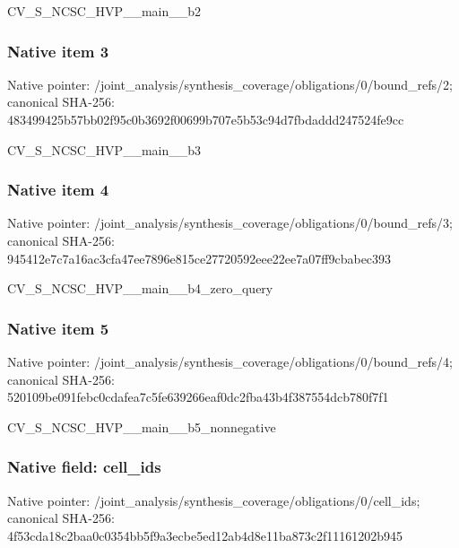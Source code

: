 \documentclass[10pt,a4paper]{article}
\begin{document}
\begingroup\raggedright\sloppy CV\_\allowbreak{}S\_\allowbreak{}NCSC\_\allowbreak{}HVP\_\allowbreak{}\_\allowbreak{}main\_\allowbreak{}\_\allowbreak{}b2\par\endgroup

\subsubsection{Native item 3}
Native pointer: /joint\_\allowbreak{}analysis/synthesis\_\allowbreak{}coverage/obligations/0/bound\_\allowbreak{}refs/2; canonical SHA-256: 483499425b57bb02f95c0b3692f00699b707e5b53c94d7fbdaddd247524fe9cc

\begingroup\raggedright\sloppy CV\_\allowbreak{}S\_\allowbreak{}NCSC\_\allowbreak{}HVP\_\allowbreak{}\_\allowbreak{}main\_\allowbreak{}\_\allowbreak{}b3\par\endgroup

\subsubsection{Native item 4}
Native pointer: /joint\_\allowbreak{}analysis/synthesis\_\allowbreak{}coverage/obligations/0/bound\_\allowbreak{}refs/3; canonical SHA-256: 945412e7c7a16ac3cfa47ee7896e815ce27720592eee22ee7a07ff9cbabec393

\begingroup\raggedright\sloppy CV\_\allowbreak{}S\_\allowbreak{}NCSC\_\allowbreak{}HVP\_\allowbreak{}\_\allowbreak{}main\_\allowbreak{}\_\allowbreak{}b4\_\allowbreak{}zero\_\allowbreak{}query\par\endgroup

\subsubsection{Native item 5}
Native pointer: /joint\_\allowbreak{}analysis/synthesis\_\allowbreak{}coverage/obligations/0/bound\_\allowbreak{}refs/4; canonical SHA-256: 520109be091febc0cdafea7c5fe639266eaf0dc2fba43b4f387554dcb780f7f1

\begingroup\raggedright\sloppy CV\_\allowbreak{}S\_\allowbreak{}NCSC\_\allowbreak{}HVP\_\allowbreak{}\_\allowbreak{}main\_\allowbreak{}\_\allowbreak{}b5\_\allowbreak{}nonnegative\par\endgroup

\subsubsection{Native field: cell\_\allowbreak{}ids}
Native pointer: /joint\_\allowbreak{}analysis/synthesis\_\allowbreak{}coverage/obligations/0/cell\_\allowbreak{}ids; canonical SHA-256: 4f53cda18c2baa0c0354bb5f9a3ecbe5ed12ab4d8e11ba873c2f11161202b945
\end{document}
